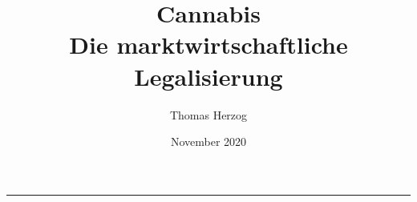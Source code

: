 \documentclass[a4paper, 12pt]{article}
\title{{\huge Cannabis}\\ Die marktwirtschaftliche Legalisierung}
\author{Thomas Herzog}
\date{November 2020}
\begin{document}
	\maketitle
	\hrule
	\pagebreak
	
	\renewcommand{\contentsname}{Inhaltsverzeichnis}
	\tableofcontents
	\pagebreak
	
	\listoffigures
	\pagebreak
	
	
	\pagebreak
	
	
	\pagebreak
	
	
	\pagebreak
	
	
	\pagebreak
	
	
	\pagebreak
	
	
	\pagebreak
	
	\renewcommand{\refname}{Literaturverzeichnis}
	
	
	
\end{document}

